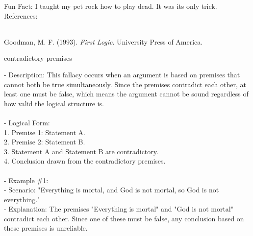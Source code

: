 \documentclass[a4paper,12pt,single,pdftex]{scrartcl}
\begin{document}
      
        Fun Fact: I taught my pet rock how to play dead. It was its only trick.
      \\

    
    References:

    
      
        
      \\

      
        
          Goodman, M. F. (1993). {\it First Logic}. University Press of America.
        
      
    
  

contradictory premises
    
      
        - Description: This fallacy occurs when an argument is based on premises that cannot both be true simultaneously. Since the premises contradict each other, at least one must be false, which means the argument cannot be sound regardless of how valid the logical structure is.
      \\

      
        
      \\

      
        - Logical Form:
      \\

      
          1. Premise 1: Statement A.
      \\

      
          2. Premise 2: Statement B.
      \\

      
          3. Statement A and Statement B are contradictory.
      \\

      
          4. Conclusion drawn from the contradictory premises.
      \\

      
        
      \\

      
        - Example \#1:
      \\

      
          - Scenario: "Everything is mortal, and God is not mortal, so God is not everything."
      \\

      
          - Explanation: The premises "Everything is mortal" and "God is not mortal" contradict each other. Since one of these must be false, any conclusion based on these premises is unreliable.
      \\
\end{document}
